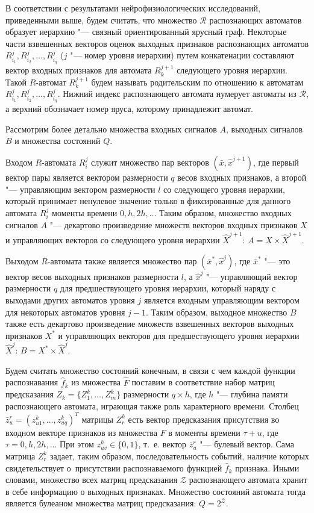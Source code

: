\documentclass[a4paper, 12pt]{article}
\theoremstyle{break}
\numberwithin{equation}{section}
\begin{document}
	В соответствии с результатами нейрофизиологических исследований, приведенными выше, будем считать, что множество  $\mathcal R$ распознающих автоматов образует иерархию "--- связный ориентированный ярусный граф. Некоторые части взвешенных векторов оценок выходных признаков распознающих автоматов $R_{i_1}^j,R_{i_2}^j,\dots,R_{i_q}^j$ ($j$ "--- номер уровня иерархии) путем конкатенации составляют вектор входных признаков для  автомата $R_k^{j+1}$ следующего уровня иерархии. Такой $R$-автомат $R_k^{j+1}$ будем называть родительским по отношению к автоматам $R_{i_1}^j,R_{i_2}^j,\dots,R_{i_q}^j$. Нижний индекс распознающего автомата нумерует автоматы из $\mathcal R$, а верхний обозначает номер яруса, которому принадлежит автомат.
		
	Рассмотрим более детально множества входных сигналов $A$, выходных сигналов $B$ и множества состояний $Q$.
	
	Входом $R$-автомата $R_i^j$ служит множество пар векторов $(\bar x,\hat x^{j+1})$, где первый вектор пары является вектором размерности $q$ весов входных признаков, а второй "--- управляющим вектором размерности $l$ со следующего уровня иерархии, который принимает ненулевое значение только в фиксированные для данного автомата $R_i^j$ моменты времени $0,h,2h,\dots$ Таким образом, множество входных сигналов $A$ "--- декартово произведение множеств векторов входных признаков $X$ и управляющих векторов со следующего уровня иерархии $\hat X^{j+1}$: $A=X\times \hat X^{j+1}$. 
	
	Выходом $R$-автомата также является множество пар $(\bar x^*,\hat x^j)$, где $\bar x^*$ "--- это вектор весов выходных признаков размерности $l$, а $\hat x^j$ "--- управляющий вектор размерности $q$ для предшествующего уровня иерархии, который наряду с выходами других автоматов уровня $j$ является входным управляющим вектором для некоторых автоматов уровня $j-1$. Таким образом, выходное множество $B$ также есть декартово произведение множеств взвешенных векторов выходных признаков $X^*$ и управляющих векторов для предшествующего уровня иерархии $\hat X^j$: $B=X^*\times \hat X^j$.
	
	Будем считать множество состояний конечным, в связи с чем каждой функции распознавания $\hat f_k$ из множества $\hat F$ поставим в соответствие набор матриц предсказания $Z_k=\{Z_1^k,…,Z_m^k\}$ размерности $q\times h$, где $h$ "--- глубина памяти распознающего автомата, играющая также роль характерного времени. Столбец $\bar{z}_u^r=(z_{u1}^k,…,z_{uq}^k)^T$ матрицы $Z_r^k$ есть вектор предсказания присутствия во входном векторе признаков из множества $F$ в моменты времени $\tau+u$, где $\tau = 0,h,2h,\dots$ При этом $z_{uv}^k\in\{0,1\}$, т.~е. вектор $\bar{z}_u^r$ "--- булевый вектор. Сама матрица $Z_r^k$ задает, таким образом, последовательность событий, наличие которых свидетельствует о~присутствии распознаваемого функцией $\hat f_k$ признака. Иными словами, множество всех матриц предсказания $\mathcal Z$ распознающего автомата хранит в себе информацию о выходных признаках. Множество состояний автомата тогда является булеаном множества матриц предсказания: $Q=2^{\mathcal Z}$.
	
\end{document}
